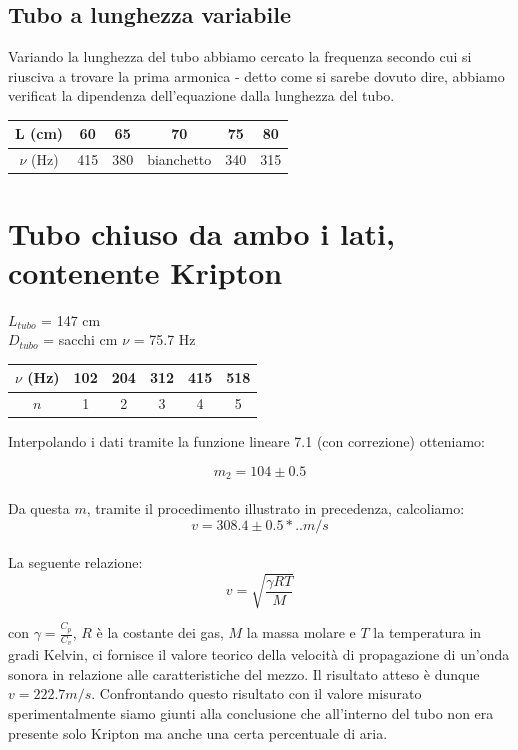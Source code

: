 \documentclass[a4paper,10pt]{report}
\begin{document}
\subsection{Tubo a lunghezza variabile}
Variando la lunghezza del tubo abbiamo cercato la frequenza secondo cui si riusciva a trovare la prima armonica - detto come si sarebe dovuto dire, abbiamo verificat la dipendenza dell'equazione dalla lunghezza del tubo.

\begin{center}
\begin{tabular}{*{5}{c|}c}
L (cm) & 60 & 65 & 70 & 75 & 80 \\
\midrule
$\nu$ (Hz) & 415 & 380 & bianchetto & 340 & 315\\
\end{tabular}
\end{center}


\section{Tubo chiuso da ambo i lati, contenente Kripton}

$L_{tubo}$ = 147 cm\\
$D_{tubo}$ = sacchi cm
$\nu$ = 75.7 Hz
 


\begin{center}
\begin{tabular}{c|c|c|c|c|c}
$\nu$ (Hz) & 102 & 204 & 312 & 415 & 518 \\
\midrule
$n$ & 1 & 2 & 3 & 4 & 5\\
\end{tabular}
\end{center}

Interpolando i dati tramite la funzione lineare 7.1 (con correzione) otteniamo:

$$ m_2 = 104 \pm 0.5 $$ 
\\
Da questa $m$, tramite il procedimento illustrato in precedenza, calcoliamo: 
$$v = 308.4\pm0.5*..  m/s $$
\\
La seguente relazione:
$$v=\sqrt{\frac{\gamma RT}{M}}$$

con $\gamma = \frac{C_p}{C_v}$, $R$ è la costante dei gas, $M$ la massa molare e $T$ la temperatura in gradi Kelvin, ci fornisce il valore teorico della velocità di propagazione di un'onda sonora in relazione alle caratteristiche del mezzo. 
Il risultato atteso è dunque $v=222.7 m/s$. Confrontando questo risultato con il valore misurato sperimentalmente siamo giunti alla conclusione che all'interno del tubo non era presente solo Kripton ma anche una certa percentuale di aria.
\end{document}

